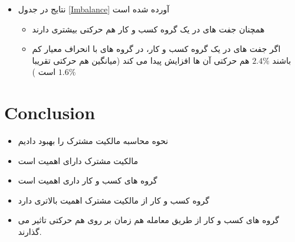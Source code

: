 \documentclass[12pt, a4paper]{article}
\begin{document}
\begin{itemize}
	\item 
	نتایج در جدول
	\ref{Imbalance}
	آورده شده است
	\begin{LTR}
	\end{LTR}
\begin{itemize}
	\item 
	همچنان جفت های در یک گروه کسب و کار هم حرکتی بیشتری دارند
	\item 
	اگر جفت های در یک گروه کسب و کار، در گروه های با انحراف معیار کم باشند $ 2.4\% $ هم حرکتی آن ها افزایش پیدا می کند
	(میانگین هم حرکتی تقریبا $ 1.6 \%$ است )

	
\end{itemize}
\end{itemize}

\FloatBarrier

 \section{Conclusion}
\begin{itemize}
	\item 
	نحوه محاسبه مالکیت مشترک را بهبود دادیم
	\item 
	مالکیت مشترک دارای اهمیت است 
	\item 
	گروه های کسب و کار داری اهمیت است
	\item 
	گروه کسب و کار از مالکیت مشترک اهمیت بالاتری دارد
	\item 
	گروه های کسب و کار از طریق معامله هم زمان بر روی هم حرکتی تاثیر می گذارند.
	
	
\end{itemize}


\newpage
\begin{LTR}

\footnotesize{
	
	
}
\end{LTR}
\end{document}
